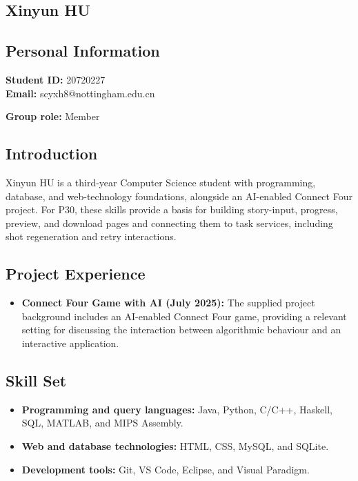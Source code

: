 \documentclass[a4paper,12pt]{article}
\newcommand{\PersonalInformation}[2]{%
  \subsection*{Personal Information}
  \if\relax\detokenize{#1}\relax\else
  \noindent\textbf{Student ID:} #1\\
  \fi
  \textbf{Email:} #2\par
}
\begin{document}
\subsection{Xinyun HU}
\PersonalInformation{20720227}{scyxh8@nottingham.edu.cn}
\noindent\textbf{Group role:} Member\par

\subsection*{Introduction}
Xinyun HU is a third-year Computer Science student with programming, database, and web-technology foundations, alongside an AI-enabled Connect Four project. For P30, these skills provide a basis for building story-input, progress, preview, and download pages and connecting them to task services, including shot regeneration and retry interactions.

\subsection*{Project Experience}
\begin{itemize}
  \item \textbf{Connect Four Game with AI (July 2025):} The supplied project background includes an AI-enabled Connect Four game, providing a relevant setting for discussing the interaction between algorithmic behaviour and an interactive application.
\end{itemize}

\subsection*{Skill Set}
\begin{itemize}
  \item \textbf{Programming and query languages:} Java, Python, C/C++, Haskell, SQL, MATLAB, and MIPS Assembly.
  \item \textbf{Web and database technologies:} HTML, CSS, MySQL, and SQLite.
  \item \textbf{Development tools:} Git, VS Code, Eclipse, and Visual Paradigm.
\end{itemize}
\end{document}
